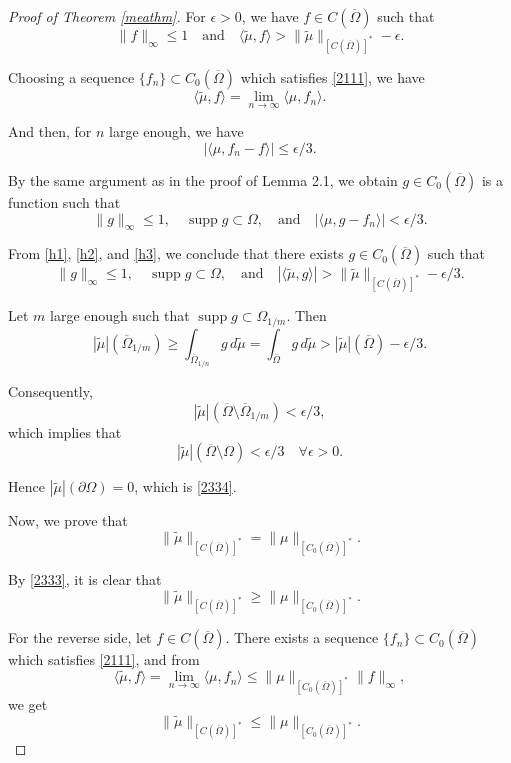 \documentclass[a4paper, 11pt]{report}
\theoremstyle{definition}\newtheorem*{rmk}{Remark}
\DeclareMathOperator{\supp}{supp}
\begin{document}
\begin{proof}[Proof of Theorem \ref{meathm}]
For $\epsilon > 0$, we have $f \in C(\overline{\Omega})$ such that
\begin{equation}\label{h1}
\| f\|_{\infty}\le 1\quad \text{and}\quad \langle \tilde{\mu}, f \rangle > \| \tilde{\mu}\|_{[C(\overline{\Omega})]^*} - \epsilon .
\end{equation}

Choosing a sequence $\{f_n\} \subset C_0(\overline{\Omega})$ which satisfies \eqref{2111}, we have
\[
\langle \tilde{\mu} , f \rangle = \lim_{n \to \infty} \langle \mu, f_n \rangle.
\]

And then, for $n$ large enough, we have
\begin{equation}\label{h2}
|\langle \mu, f_n - f \rangle | \le \epsilon / 3.
\end{equation}

By the same argument as in the proof of Lemma 2.1, we obtain $g\in C_0(\overline{\Omega})$ is a function such that
\begin{equation}\label{h3}
\| g\|_{\infty}\le 1,\quad \supp g \subset \Omega, \quad \text{and}\quad |\langle \mu, g - f_n \rangle | < \epsilon / 3.
\end{equation}

From \eqref{h1}, \eqref{h2}, and \eqref{h3}, we conclude that there exists $g\in C_0(\overline{\Omega})$ such that
\[
\| g\|_{\infty}\le 1 ,\quad \supp g \subset \Omega,\quad \text{and} \quad|\langle \tilde{\mu} , g \rangle | > \| \tilde{\mu}\|_{[C(\overline{\Omega})]^*} - \epsilon / 3.
\]

Let $m$ large enough such that $\supp g \subset \Omega_{1/m}$. Then
\[
|\tilde{\mu} | (\overline{\Omega}_{1/m})\ge \int_{\overline{\Omega}_{1/n}} g \,d\tilde{\mu} = \int_{\overline{\Omega}} g \,d\tilde{\mu} > |\tilde{\mu} | (\overline{\Omega}) -\epsilon / 3 .
\]

Consequently,
\[
|\tilde{\mu} | (\overline{\Omega}\setminus \overline{\Omega}_{1/m}) < \epsilon / 3,
\]
which implies that
\[
|\tilde{\mu} | (\overline{\Omega}\setminus \Omega) < \epsilon / 3 \quad \forall \epsilon > 0.
\]

Hence $|\tilde{\mu} | (\partial \Omega ) = 0$, which is \eqref{2334}.

Now, we prove that 
\[
\| \tilde{\mu}\|_{[C(\overline{\Omega})]^*} = \| \mu\|_{[C_0(\overline{\Omega})]^*}.
\]

By \eqref{2333}, it is clear that 
\[
\| \tilde{\mu}\|_{[C(\overline{\Omega})]^*} \ge \| \mu\|_{[C_0(\overline{\Omega})]^*}.
\]

For the reverse side, let $f\in C(\overline{\Omega})$. There exists a sequence $\{f_n\}\subset C_0(\overline{\Omega})$ which satisfies \eqref{2111}, and from
\[
\langle \tilde{\mu} , f \rangle = \lim_{n \to \infty} \langle \mu, f_n \rangle \le \| \mu\|_{[C_0(\overline{\Omega})]^*}\| f\|_{\infty},
\]
we get
\[
\| \tilde{\mu}\|_{[C(\overline{\Omega})]^*} \le \| \mu\|_{[C_0(\overline{\Omega})]^*}.
\]


\end{proof}
\end{document}
